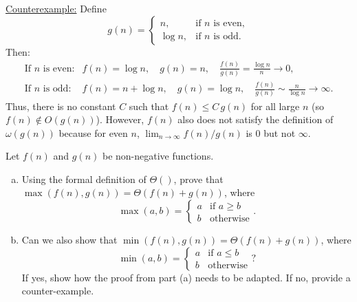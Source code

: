 \documentclass[11pt]{article}
\begin{document}
    \underline{Counterexample:} Define
    \[
    g(n)=
    \begin{cases}
    n, & \text{if \(n\) is even},\\[1mm]
    \log n, & \text{if \(n\) is odd}.
    \end{cases}
    \]
    Then:
    \[
    \begin{array}{rcl}
    \text{If } n \text{ is even:} & f(n)=\log n,\quad g(n)=n,\quad \frac{f(n)}{g(n)}=\frac{\log n}{n}\to 0,\\[1mm]
    \text{If } n \text{ is odd:} & f(n)= n+\log n,\quad g(n)=\log n,\quad \frac{f(n)}{g(n)}\sim \frac{n}{\log n}\to \infty.
    \end{array}
    \]
    Thus, there is no constant \(C\) such that \(f(n)\le C\,g(n)\) for all large \(n\) (so \(f(n)\notin O(g(n))\)). However, \(f(n)\) also does not satisfy the definition of \(\omega(g(n))\) because for even \(n\), \( \lim_{n\to\infty} f(n)/g(n)\) is 0 but not \(\infty\). 
    
    \newpage
    \begin{tcolorbox}[title={Problem 3 (20 pts)}]
    Let $f(n)$ and $g(n)$ be non-negative functions. \begin{enumerate}[(a)]
        \item Using the formal definition of $\Theta()$, prove that $\max(f(n),g(n))=\Theta(f(n)+g(n))$, where \[\max(a, b)=\begin{cases}
        a &\text{if } a\geq b\\
        b &\text{otherwise}
    \end{cases}.\]
        \item Can we also show that $\min(f(n),g(n))=\Theta(f(n)+g(n))$, where \[\min(a, b)=\begin{cases}
        a &\text{if } a\leq b\\
        b &\text{otherwise}
    \end{cases}?\] If yes, show how the proof from part (a) needs to be adapted. If no, provide a counter-example.
    \end{enumerate}
    
    \end{tcolorbox}
    
\end{document}
